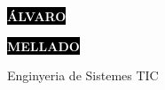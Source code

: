 \documentclass[9pt]{developercv} %
\begin{document}

\begin{minipage}[t]{0.6\textwidth} %
	\vspace{-\baselineskip} %

	\colorbox{black}{{\HUGE\textcolor{white}{\textbf{\MakeUppercase{Álvaro}}}}} %

	\colorbox{black}{{\HUGE\textcolor{white}{\textbf{\MakeUppercase{Mellado}}}}} %

	\vspace{6pt}

	{\huge Enginyeria de Sistemes TIC} %
\end{minipage}
\begin{minipage}[t]{0.275\textwidth} %
	\vspace{-\baselineskip} %

	\\
	\\
	\\
\end{minipage}
\begin{minipage}[t]{0.275\textwidth} %
	\vspace{-\baselineskip} %


\end{minipage}
\end{document}
